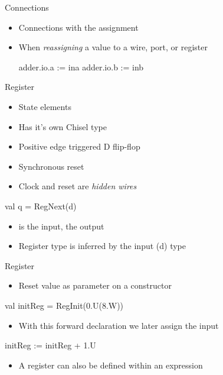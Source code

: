 \begin{frame}[fragile]{Connections}
\begin{itemize}
\item Connections with the \code{:=} assignment
\item When \emph{reassigning} a value to a wire, port, or register
\begin{chisel}
  adder.io.a := ina
  adder.io.b := inb
\end{chisel}
\end{itemize}
\end{frame}


\begin{frame}[fragile]{Register}
\begin{itemize}
\item State elements
\item Has it's own Chisel type 
\item Positive edge triggered D flip-flop
\item Synchronous reset
\item Clock and reset are \emph{hidden wires}
\end{itemize}
\begin{chisel}
val q = RegNext(d)
\end{chisel}
\begin{itemize}
\item {} is the input,  the output
\item Register type is inferred by the input (d) type
\end{itemize}
\end{frame}

\begin{frame}[fragile]{Register}
\begin{itemize}
\item Reset value as parameter on a  constructor
\end{itemize}
\begin{chisel}
val initReg = RegInit(0.U(8.W))
\end{chisel}
\begin{itemize}
\item With this forward declaration we later assign the input
\end{itemize}
\begin{chisel}
initReg := initReg + 1.U
\end{chisel}
\begin{itemize}
\item A register can also be defined within an expression
\end{itemize}
\end{frame}


